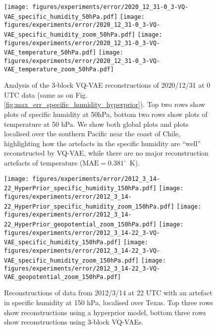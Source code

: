 \documentclass[11pt, a4paper, logo, copyright, numbering]{googledeepmind}
\begin{document}
\begin{figure}
    \centering
    \texttt{[image: figures/experiments/error/2020\_12\_31-0\_3-VQ-VAE\_specific\_humidity\_50hPa.pdf]}
    \texttt{[image: figures/experiments/error/2020\_12\_31-0\_3-VQ-VAE\_specific\_humidity\_zoom\_50hPa.pdf]}
    \texttt{[image: figures/experiments/error/2020\_12\_31-0\_3-VQ-VAE\_temperature\_50hPa.pdf]}
    \texttt{[image: figures/experiments/error/2020\_12\_31-0\_3-VQ-VAE\_temperature\_zoom\_50hPa.pdf]}
    \hfill
    \caption{Analysis of the 3-block VQ-VAE reconstructions of 2020/12/31 at 0 UTC data (same as on Fig. \ref{fig:max_err_specific_humidity_hyperprior}). Top two rows show plots of specific humidity at 50hPa, bottom two rows show plots of temperature at 50 hPa. We show both global plots and plots localised over the southern Pacific near the coast of Chile, highlighting how the artefacts in the specific humidity are ``well'' reconstructed by VQ-VAE, while there are no major reconstruction artefacts of temperature ($\text{MAE}=0.381^\circ$~K).}
    \label{fig:max_err_specific_humidity_vqvae}
\end{figure}

\begin{figure}
    \centering
    \texttt{[image: figures/experiments/error/2012\_3\_14-22\_HyperPrior\_specific\_humidity\_150hPa.pdf]}
    \texttt{[image: figures/experiments/error/2012\_3\_14-22\_HyperPrior\_specific\_humidity\_zoom\_150hPa.pdf]}
    \texttt{[image: figures/experiments/error/2012\_3\_14-22\_HyperPrior\_geopotential\_zoom\_150hPa.pdf]}
    \texttt{[image: figures/experiments/error/2012\_3\_14-22\_3-VQ-VAE\_specific\_humidity\_150hPa.pdf]}
    \texttt{[image: figures/experiments/error/2012\_3\_14-22\_3-VQ-VAE\_specific\_humidity\_zoom\_150hPa.pdf]}
    \texttt{[image: figures/experiments/error/2012\_3\_14-22\_3-VQ-VAE\_geopotential\_zoom\_150hPa.pdf]}
    \hfill
    \caption{Reconstructions of data from 2012/3/14 at 22 UTC with an artefact in specific humidity at 150 hPa, localised over Texas. Top three rows show reconstructions using a hyperprior model, bottom three rows show reconstructions using 3-block VQ-VAEs.}
    \label{fig:max_err_specific_humidity_alt}
\end{figure}
 
\end{document}

